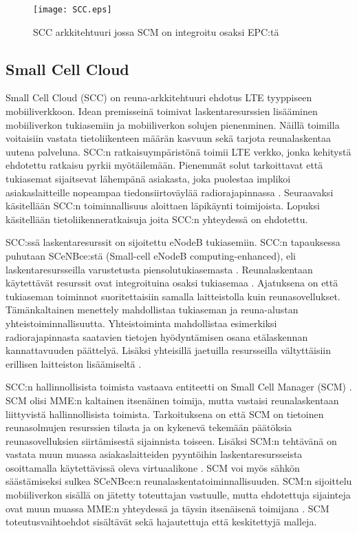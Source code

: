 \begin{figure}[tb]
\texttt{[image: SCC.eps]}
\caption{SCC arkkitehtuuri jossa SCM on integroitu osaksi EPC:tä} \label{fig:scc}
\end{figure}

\subsection{Small Cell Cloud} \label{scc}

Small Cell Cloud (SCC) on reuna-arkkitehtuuri ehdotus LTE tyyppiseen mobiiliverkkoon.
Idean premisseinä toimivat laskentaresurssien lisääminen mobiiliverkon tukiasemiin ja mobiiliverkon solujen pienenminen.
Näillä toimilla voitaisiin vastata tietoliikenteen määrän kasvuun sekä tarjota reunalaskentaa uutena palveluna.
SCC:n ratkaisuympäristönä toimii LTE verkko, jonka kehitystä ehdotettu ratkaisu pyrkii myötäilemään.
Pienemmät solut tarkoittavat että tukiasemat sijaitsevat lähempänä asiakasta, joka puolestaa implikoi asiakaslaitteille nopeampaa tiedonsiirtoväylää radiorajapinnassa \cite{lobillo15scc}.
Seuraavaksi käsitellään SCC:n toiminnallisuus aloittaen läpikäynti toimijoista. Lopuksi käsitellään tietoliikenneratkaisuja joita SCC:n yhteydessä on ehdotettu.

SCC:ssä laskentaresurssit on sijoitettu eNodeB tukiasemiin. SCC:n tapauksessa puhutaan SCeNBce:stä (Small-cell eNodeB computing-enhanced), eli laskentaresursseilla varustetusta piensolutukiasemasta \cite{lobillo15scc}.
Reunalaskentaan käytettävät resurssit ovat integroituina osaksi tukiasemaa \cite{puente15seamless}.
Ajatuksena on että tukiaseman toiminnot suoritettaisiin samalla laitteistolla kuin reunasovellukset.
Tämänkaltainen menettely mahdollistaa tukiaseman ja reuna-alustan yhteistoiminnallisuutta.
Yhteistoiminta mahdollistaa esimerkiksi radiorajapinnasta saatavien tietojen hyödyntämisen osana etälaskennan kannattavuuden päättelyä.
Lisäksi yhteisillä jaetuilla resursseilla vältyttäisiin erillisen laitteiston lisäämiseltä \cite{puente15seamless}.

SCC:n hallinnollisista toimista vastaava entiteetti on Small Cell Manager (SCM) \cite{lobillo15scc}.
SCM olisi MME:n kaltainen itsenäinen toimija, mutta vastaisi reunalaskentaan liittyvistä hallinnollisista toimista.
Tarkoituksena on että SCM on tietoinen reunasolmujen resurssien tilasta ja on kykenevä tekemään päätöksia reunasovelluksien siirtämisestä sijainnista toiseen. 
Lisäksi SCM:n tehtävänä on vastata muun muassa asiakaslaitteiden pyyntöihin laskentaresursseista osoittamalla käytettävissä oleva virtuaalikone \cite{dolezal2016performance}.
SCM voi myös sähkön säästämiseksi sulkea SCeNBce:n reunalaskentatoiminnallisuuden.
SCM:n sijoittelu mobiiliverkon sisällä on jätetty toteuttajan vastuulle, mutta ehdotettuja sijainteja ovat muun muassa MME:n yhteydessä ja täysin itsenäisenä toimijana \cite{lobillo15scc}.
SCM toteutusvaihtoehdot sisältävät sekä hajautettuja että keskitettyjä malleja.

